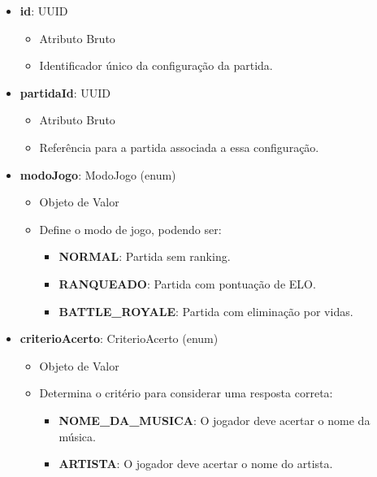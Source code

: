     \begin{itemize}
        \item \textbf{id}: UUID  
              \begin{itemize}
                  \item Atributo Bruto
                  \item Identificador único da configuração da partida.
              \end{itemize}
    
        \item \textbf{partidaId}: UUID  
              \begin{itemize}
                  \item Atributo Bruto
                  \item Referência para a partida associada a essa configuração.
              \end{itemize}
    
        \item \textbf{modoJogo}: ModoJogo (enum)  
              \begin{itemize}
                  \item Objeto de Valor
                  \item Define o modo de jogo, podendo ser:
                  \begin{itemize}
                      \item \textbf{NORMAL}: Partida sem ranking.
                      \item \textbf{RANQUEADO}: Partida com pontuação de ELO.
                      \item \textbf{BATTLE\_ROYALE}: Partida com eliminação por vidas.
                  \end{itemize}
              \end{itemize}
    
        \item \textbf{criterioAcerto}: CriterioAcerto (enum)  
              \begin{itemize}
                  \item Objeto de Valor
                  \item Determina o critério para considerar uma resposta correta:
                  \begin{itemize}
                      \item \textbf{NOME\_DA\_MUSICA}: O jogador deve acertar o nome da música.
                      \item \textbf{ARTISTA}: O jogador deve acertar o nome do artista.
                  \end{itemize}
              \end{itemize}
    

\end{itemize}

